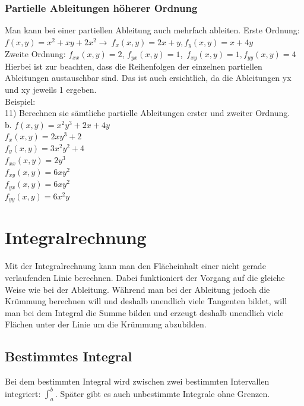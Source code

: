 \documentclass{article}
\begin{document}
	\subsubsection{Partielle Ableitungen höherer Ordnung}
	Man kann bei einer partiellen Ableitung auch mehrfach ableiten. 
	Erste Ordnung: $f(x,y)=x^2+xy+2x^2\to\ f_x(x,y)=2x+y, f_y(x,y)=x+4y$ \\
	Zweite Ordnung: $f_{xx}(x,y)=2$, $f_{yx}(x,y)=1$,\ $f_{xy}(x,y)=1, f_{yy}(x,y)=4$ \\
	Hierbei ist zur beachten, dass die Reihenfolgen der einzelnen partiellen Ableitungen austauschbar sind. Das ist auch ersichtlich, da die Ableitungen yx und xy jeweils 1 ergeben. \\
	Beispiel: \\
	11) Berechnen sie sämtliche partielle Ableitungen erster und zweiter Ordnung. \\
	b. \textbf{$f(x,y)=x^2y^3+2x+4y$} \\
	$f_x(x,y)=2xy^3+2$ \\
	$f_y(x,y)=3x^2y^2+4$ \\
	$f_{xx}(x,y)=2y^3$ \\
	$f_{xy}(x,y)=6xy^2$ \\
	$f_{yx}(x,y)=6xy^2$ \\
	$f_{yy}(x,y)=6x^2y$ \\
	\section{Integralrechnung}
	Mit der Integralrechnung kann man den Flächeinhalt einer nicht gerade verlaufenden Linie berechnen. Dabei funktioniert der Vorgang auf die gleiche Weise wie bei der Ableitung. Während man bei der Ableitung jedoch die Krümmung berechnen will und deshalb unendlich viele Tangenten bildet, will man bei dem Integral die Summe bilden und erzeugt deshalb unendlich viele Flächen unter der Linie um die Krümmung abzubilden.
	\subsection{Bestimmtes Integral}
	Bei dem bestimmten Integral wird zwischen zwei bestimmten Intervallen integriert: $\int_{a}^{b}$. Später gibt es auch unbestimmte Integrale ohne Grenzen. \\
\end{document}
